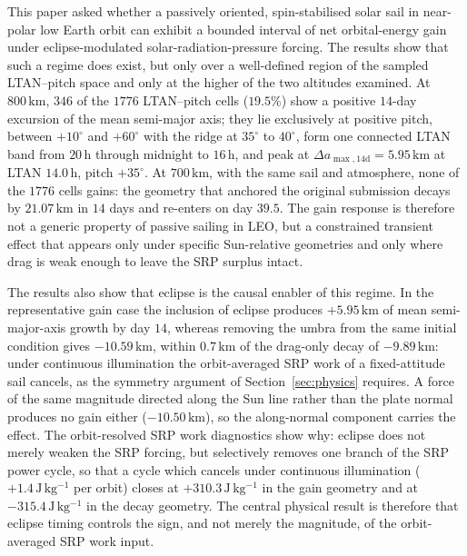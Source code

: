 \FloatBarrier
\noindent This paper asked whether a passively oriented, spin-stabilised solar sail in near-polar low Earth orbit can exhibit a bounded interval of net orbital-energy gain under eclipse-modulated solar-radiation-pressure forcing. The results show that such a regime does exist, but only over a well-defined region of the sampled LTAN--pitch space and only at the higher of the two altitudes examined. At \(800\,\mathrm{km}\), \(346\) of the \(1776\) LTAN--pitch cells (\(19.5\%\)) show a positive \(14\)-day excursion of the mean semi-major axis; they lie exclusively at positive pitch, between \(+10^\circ\) and \(+60^\circ\) with the ridge at \(35^\circ\) to \(40^\circ\), form one connected LTAN band from \(20\,\mathrm{h}\) through midnight to \(16\,\mathrm{h}\), and peak at \(\Delta a_{\max,14\mathrm{d}} = 5.95\,\mathrm{km}\) at LTAN \(14.0\,\mathrm{h}\), pitch \(+35^\circ\). At \(700\,\mathrm{km}\), with the same sail and atmosphere, none of the \(1776\) cells gains: the geometry that anchored the original submission decays by \(21.07\,\mathrm{km}\) in \(14\) days and re-enters on day \(39.5\). The gain response is therefore not a generic property of passive sailing in LEO, but a constrained transient effect that appears only under specific Sun-relative geometries and only where drag is weak enough to leave the SRP surplus intact.

\vspace{5pt}
\par\noindent The results also show that eclipse is the causal enabler of this regime. In the representative gain case the inclusion of eclipse produces \(+5.95\,\mathrm{km}\) of mean semi-major-axis growth by day \(14\), whereas removing the umbra from the same initial condition gives \(-10.59\,\mathrm{km}\), within \(0.7\,\mathrm{km}\) of the drag-only decay of \(-9.89\,\mathrm{km}\): under continuous illumination the orbit-averaged SRP work of a fixed-attitude sail cancels, as the symmetry argument of Section~\ref{sec:physics} requires. A force of the same magnitude directed along the Sun line rather than the plate normal produces no gain either (\(-10.50\,\mathrm{km}\)), so the along-normal component carries the effect. The orbit-resolved SRP work diagnostics show why: eclipse does not merely weaken the SRP forcing, but selectively removes one branch of the SRP power cycle, so that a cycle which cancels under continuous illumination (\(+1.4\,\mathrm{J\,kg^{-1}}\) per orbit) closes at \(+310.3\,\mathrm{J\,kg^{-1}}\) in the gain geometry and at \(-315.4\,\mathrm{J\,kg^{-1}}\) in the decay geometry. The central physical result is therefore that eclipse timing controls the sign, and not merely the magnitude, of the orbit-averaged SRP work input.

